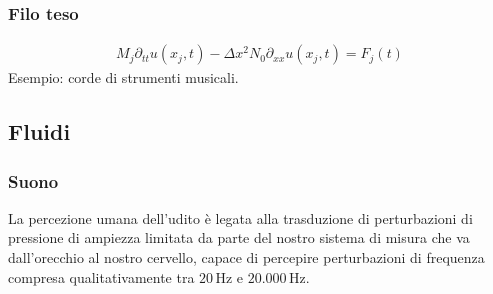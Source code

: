 \documentclass[letterpaper,10pt,italian]{jupyterBook}
\begin{document}
\subsubsection{Filo teso}
\label{\detokenize{ch/waves/intro:filo-teso}}\label{\detokenize{ch/waves/intro:physics-hs-waves-equation-examples-mechanics-string}}\begin{equation*}
\begin{split}M_j \partial_{tt} u(x_j,t) - \Delta x^2 N_0 \partial_{xx} u(x_j,t) = F_j(t)\end{split}
\end{equation*}
\sphinxAtStartPar
Esempio: corde di strumenti musicali.


\subsection{Fluidi}
\label{\detokenize{ch/waves/intro:fluidi}}\label{\detokenize{ch/waves/intro:physics-hs-waves-equation-examples-fluids}}

\subsubsection{Suono}
\label{\detokenize{ch/waves/intro:suono}}\label{\detokenize{ch/waves/intro:physics-hs-waves-equation-examples-fluids-sound}}
\sphinxAtStartPar
La percezione umana dell’udito è legata alla trasduzione di perturbazioni di pressione di ampiezza limitata da parte del nostro sistema di misura che va dall’orecchio al nostro cervello, capace di percepire perturbazioni di frequenza compresa qualitativamente tra \(20 \, \text{Hz}\) e \(20.000 \, \text{Hz}\).

\sphinxAtStartPar
{}
\end{document}
